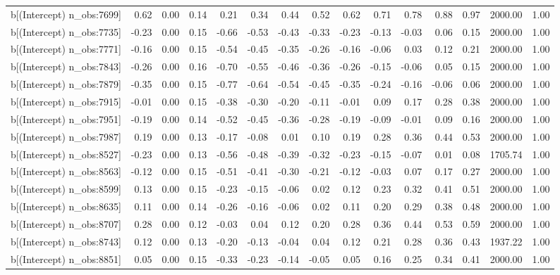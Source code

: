\begin{table}[ht]
\begin{tabular}{rrrrrrrrrrrrrrr}
  b[(Intercept) n\_obs:7699] & 0.62 & 0.00 & 0.14 & 0.21 & 0.34 & 0.44 & 0.52 & 0.62 & 0.71 & 0.78 & 0.88 & 0.97 & 2000.00 & 1.00 \\ 
  b[(Intercept) n\_obs:7735] & -0.23 & 0.00 & 0.15 & -0.66 & -0.53 & -0.43 & -0.33 & -0.23 & -0.13 & -0.03 & 0.06 & 0.15 & 2000.00 & 1.00 \\ 
  b[(Intercept) n\_obs:7771] & -0.16 & 0.00 & 0.15 & -0.54 & -0.45 & -0.35 & -0.26 & -0.16 & -0.06 & 0.03 & 0.12 & 0.21 & 2000.00 & 1.00 \\ 
  b[(Intercept) n\_obs:7843] & -0.26 & 0.00 & 0.16 & -0.70 & -0.55 & -0.46 & -0.36 & -0.26 & -0.15 & -0.06 & 0.05 & 0.15 & 2000.00 & 1.00 \\ 
  b[(Intercept) n\_obs:7879] & -0.35 & 0.00 & 0.15 & -0.77 & -0.64 & -0.54 & -0.45 & -0.35 & -0.24 & -0.16 & -0.06 & 0.06 & 2000.00 & 1.00 \\ 
  b[(Intercept) n\_obs:7915] & -0.01 & 0.00 & 0.15 & -0.38 & -0.30 & -0.20 & -0.11 & -0.01 & 0.09 & 0.17 & 0.28 & 0.38 & 2000.00 & 1.00 \\ 
  b[(Intercept) n\_obs:7951] & -0.19 & 0.00 & 0.14 & -0.52 & -0.45 & -0.36 & -0.28 & -0.19 & -0.09 & -0.01 & 0.09 & 0.16 & 2000.00 & 1.00 \\ 
  b[(Intercept) n\_obs:7987] & 0.19 & 0.00 & 0.13 & -0.17 & -0.08 & 0.01 & 0.10 & 0.19 & 0.28 & 0.36 & 0.44 & 0.53 & 2000.00 & 1.00 \\ 
  b[(Intercept) n\_obs:8527] & -0.23 & 0.00 & 0.13 & -0.56 & -0.48 & -0.39 & -0.32 & -0.23 & -0.15 & -0.07 & 0.01 & 0.08 & 1705.74 & 1.00 \\ 
  b[(Intercept) n\_obs:8563] & -0.12 & 0.00 & 0.15 & -0.51 & -0.41 & -0.30 & -0.21 & -0.12 & -0.03 & 0.07 & 0.17 & 0.27 & 2000.00 & 1.00 \\ 
  b[(Intercept) n\_obs:8599] & 0.13 & 0.00 & 0.15 & -0.23 & -0.15 & -0.06 & 0.02 & 0.12 & 0.23 & 0.32 & 0.41 & 0.51 & 2000.00 & 1.00 \\ 
  b[(Intercept) n\_obs:8635] & 0.11 & 0.00 & 0.14 & -0.26 & -0.16 & -0.06 & 0.02 & 0.11 & 0.20 & 0.29 & 0.38 & 0.48 & 2000.00 & 1.00 \\ 
  b[(Intercept) n\_obs:8707] & 0.28 & 0.00 & 0.12 & -0.03 & 0.04 & 0.12 & 0.20 & 0.28 & 0.36 & 0.44 & 0.53 & 0.59 & 2000.00 & 1.00 \\ 
  b[(Intercept) n\_obs:8743] & 0.12 & 0.00 & 0.13 & -0.20 & -0.13 & -0.04 & 0.04 & 0.12 & 0.21 & 0.28 & 0.36 & 0.43 & 1937.22 & 1.00 \\ 
  b[(Intercept) n\_obs:8851] & 0.05 & 0.00 & 0.15 & -0.33 & -0.23 & -0.14 & -0.05 & 0.05 & 0.16 & 0.25 & 0.34 & 0.41 & 2000.00 & 1.00 \\ 

\end{tabular}
\end{table}
